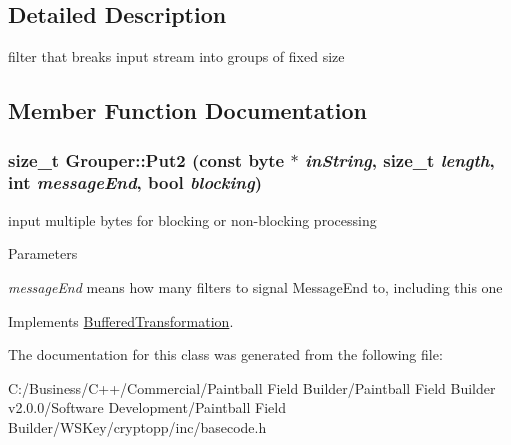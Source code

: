 \subsection{Detailed Description}
filter that breaks input stream into groups of fixed size 

\subsection{Member Function Documentation}
\hypertarget{class_grouper_a21cb0add26fcf2607329927714f4e3bb}{
\subsubsection[{Put2}]{\setlength{\rightskip}{0pt plus 5cm}size\_\-t Grouper::Put2 (const byte $\ast$ {\em inString}, \/  size\_\-t {\em length}, \/  int {\em messageEnd}, \/  bool {\em blocking})}}
\label{class_grouper_a21cb0add26fcf2607329927714f4e3bb}


input multiple bytes for blocking or non-\/blocking processing 
\begin{DoxyParams}{Parameters}
\item[{\em messageEnd}]means how many filters to signal MessageEnd to, including this one \end{DoxyParams}


Implements \hyperlink{class_buffered_transformation_ad396dcb42260f23125a35ec0e5d17d55}{BufferedTransformation}.

The documentation for this class was generated from the following file:\begin{DoxyCompactItemize}
\item 
C:/Business/C++/Commercial/Paintball Field Builder/Paintball Field Builder v2.0.0/Software Development/Paintball Field Builder/WSKey/cryptopp/inc/basecode.h\end{DoxyCompactItemize}
